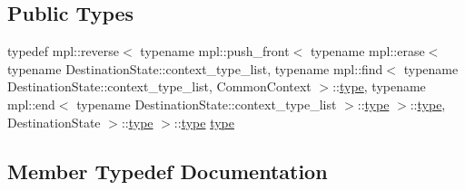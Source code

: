 \subsection*{Public Types}
\begin{DoxyCompactItemize}
\item 
typedef mpl\+::reverse$<$ typename mpl\+::push\+\_\+front$<$ typename mpl\+::erase$<$ typename Destination\+State\+::context\+\_\+type\+\_\+list, typename mpl\+::find$<$ typename Destination\+State\+::context\+\_\+type\+\_\+list, Common\+Context $>$\+::\mbox{\hyperlink{structboost_1_1statechart_1_1detail_1_1make__context__list_a2874fb24dd80c6537533d389755d7a7b}{type}}, typename mpl\+::end$<$ typename Destination\+State\+::context\+\_\+type\+\_\+list $>$\+::\mbox{\hyperlink{structboost_1_1statechart_1_1detail_1_1make__context__list_a2874fb24dd80c6537533d389755d7a7b}{type}} $>$\+::\mbox{\hyperlink{structboost_1_1statechart_1_1detail_1_1make__context__list_a2874fb24dd80c6537533d389755d7a7b}{type}}, Destination\+State $>$\+::\mbox{\hyperlink{structboost_1_1statechart_1_1detail_1_1make__context__list_a2874fb24dd80c6537533d389755d7a7b}{type}} $>$\+::\mbox{\hyperlink{structboost_1_1statechart_1_1detail_1_1make__context__list_a2874fb24dd80c6537533d389755d7a7b}{type}} \mbox{\hyperlink{structboost_1_1statechart_1_1detail_1_1make__context__list_a2874fb24dd80c6537533d389755d7a7b}{type}}
\end{DoxyCompactItemize}


\subsection{Member Typedef Documentation}
\mbox{\label{structboost_1_1statechart_1_1detail_1_1make__context__list_a2874fb24dd80c6537533d389755d7a7b}} 

